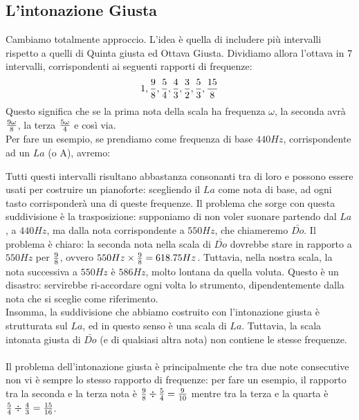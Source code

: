 \documentclass[12pt,a4paper]{report}
\theoremstyle{definition}
\theoremstyle{Theorem}
\theoremstyle{definition}
\theoremstyle{definition}
\theoremstyle{definition}
\begin{document}
	 \subsection{L'intonazione Giusta}
	 Cambiamo totalmente approccio. L'idea è quella di includere più intervalli rispetto a quelli di Quinta giusta ed Ottava Giusta. Dividiamo allora l'ottava in 7 intervalli, corrispondenti ai seguenti rapporti di frequenze:
	 $$1,{9\over8},{5\over4},{4\over3},{3\over 2},{5\over3},{15\over8}$$
	 Questo significa che se la prima nota della scala ha frequenza $\omega$, la seconda avrà $9\omega\over8$, la terza ${5\omega\over 4}$ e così via.\\
	 Per fare un esempio, se prendiamo come frequenza di base $440 Hz$, corrispondente ad un $La$ (o A), avremo:\\
	 \begin{center}
	 \end{center}
	 Tutti questi intervalli risultano abbastanza consonanti tra di loro e possono essere usati per costruire un pianoforte: scegliendo il $La$  come nota di base, ad ogni tasto corrisponderà una di queste frequenze.
	 Il problema che sorge con questa suddivisione è la trasposizione: supponiamo di non voler suonare partendo dal $La$, a $440 Hz$, ma dalla nota corrispondente a $550 Hz$, che chiameremo $\bar{Do}$. Il problema è chiaro: la seconda nota nella scala di $\bar{Do}$ dovrebbe stare in rapporto a $550 Hz$ per $9\over 8$, ovvero $550Hz\times {9\over 8}=618.75Hz$. Tuttavia, nella nostra scala, la nota successiva a $550 Hz$ è $586 Hz$, molto lontana da quella voluta. Questo è un disastro: servirebbe ri-accordare ogni volta lo strumento, dipendentemente dalla nota che si sceglie come riferimento.\\
	 Insomma, la suddivisione che abbiamo costruito con l'intonazione giusta è strutturata sul $La$, ed in questo senso è una scala di $La$. Tuttavia, la scala intonata giusta di $\bar{Do}$ (e di qualsiasi altra nota) non contiene le stesse frequenze.\\
	 \\ 
	 Il problema dell'intonazione giusta è principalmente che tra due note consecutive non vi è sempre lo stesso rapporto di frequenze: per fare un esempio, il rapporto tra la seconda e la terza nota è ${9\over 8}\div {5\over 4}={9\over 10}$ mentre tra la terza e la quarta è ${5\over 4}\div {4\over 3}= {15\over 16}$.
\end{document}

